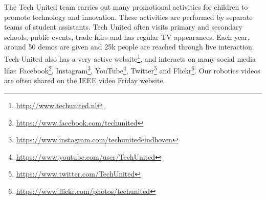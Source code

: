 The Tech United team carries out many promotional activities for children to promote technology and innovation. These activities are performed by separate teams of student assistants. Tech United often visits primary and secondary schools, public events, trade fairs and has regular TV appearances. Each year, around 50 demos are given and 25k people are reached through live interaction.
Tech United also has a very active website\footnote{\url{http://www.techunited.nl}}, and interacts on many social media like: Facebook\footnote{\url{https://www.facebook.com/techunited}}, Instagram\footnote{\url{https://www.instagram.com/techunitedeindhoven}}, YouTube\footnote{\url{https://www.youtube.com/user/TechUnited}}, Twitter\footnote{\url{https://www.twitter.com/TechUnited}} and Flickr\footnote{\url{https://www.flickr.com/photos/techunited}}. Our robotics videos are often shared on the IEEE video Friday website.
